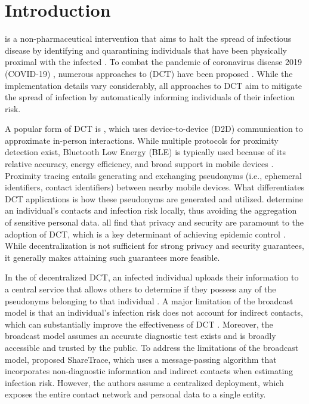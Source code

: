 \chapter{Introduction}

 is a non-pharmaceutical intervention that aims to halt the spread of infectious disease by identifying and quarantining individuals that have been physically proximal with the infected \citep{PozoMartin2023}. To combat the pandemic of coronavirus disease 2019 (COVID-19) \citep{Zhu2020, Gorbalenya2020, Singh2021}, numerous approaches to  (DCT) have been proposed \citep{Shubina2020, Reichert2021, Troncoso2022, Gupta2023, Cherini2023}. While the implementation details vary considerably, all approaches to DCT aim to mitigate the spread of infection by automatically informing individuals of their infection risk.

A popular form of DCT is , which uses device-to-device (D2D) communication \citep{Haus2017} to approximate in-person interactions. While multiple protocols for proximity detection exist, Bluetooth Low Energy (BLE) is typically used because of its relative accuracy, energy efficiency, and broad support in mobile devices \citep{Shubina2020, Reichert2021}. Proximity tracing entails generating and exchanging pseudonyms (i.e., ephemeral identifiers, contact identifiers) between nearby mobile devices. What differentiates DCT applications is how these pseudonyms are generated and utilized.  determine an individual's contacts and infection risk locally, thus avoiding the aggregation of sensitive personal data. \citet{Oyibo2022, Afroogh2022, Simko2022} all find that privacy and security are paramount to the adoption of DCT, which is a key determinant of achieving epidemic control \citep{PozoMartin2023}. While decentralization is not sufficient for strong privacy and security guarantees, it generally makes attaining such guarantees more feasible.

In the  of decentralized DCT, an infected individual uploads their information to a central service that allows others to determine if they possess any of the pseudonyms belonging to that individual \citep{Reichert2021}. A major limitation of the broadcast model is that an individual's infection risk does not account for indirect contacts, which can substantially improve the effectiveness of DCT \citep{PozoMartin2023}. Moreover, the broadcast model assumes an accurate diagnostic test exists and is broadly accessible and trusted by the public. To address the limitations of the broadcast model, \citet{Ayday2021} proposed ShareTrace, which uses a message-passing algorithm that incorporates non-diagnostic information and indirect contacts when estimating infection risk. However, the authors assume a centralized deployment, which exposes the entire contact network and personal data to a single entity.

